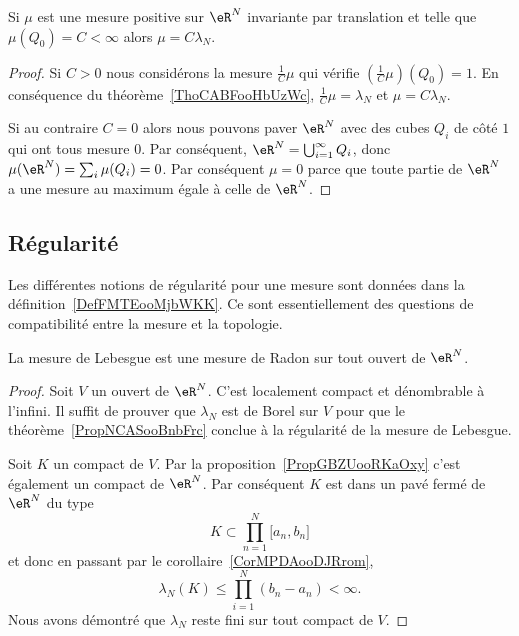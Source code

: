 \begin{corollary}       \label{CorKGMRooHWOQGP}
    Si \( \mu\) est une mesure positive sur \( \eR^N\) invariante par translation et telle que \( \mu(Q_0)=C<\infty\) alors \( \mu=C\lambda_N\).
\end{corollary}

\begin{proof}
    Si \( C>0\) nous considérons la mesure \( \frac{1}{ C }\mu\) qui vérifie \( (\frac{1}{ C }\mu)(Q_0)=1\). En conséquence du théorème~\ref{ThoCABFooHbUzWc}, \( \frac{1}{ C }\mu=\lambda_N\) et \( \mu=C\lambda_N\).

    Si au contraire \( C=0\) alors nous pouvons paver \( \eR^N\) avec des cubes \( Q_i\) de côté \( 1\) qui ont tous mesure \( 0\). Par conséquent, \( \eR^N=\bigcup_{i=1}^{\infty}Q_i\), donc \( \mu(\eR^N)=\sum_i\mu(Q_i)=0\). Par conséquent \( \mu=0\) parce que toute partie de \( \eR^N\) a une mesure au maximum égale à celle de \( \eR^N\).
\end{proof}

\subsection{Régularité}

Les différentes notions de régularité pour une mesure sont données dans la définition~\ref{DefFMTEooMjbWKK}. Ce sont essentiellement des questions de compatibilité entre la mesure et la topologie.
\begin{proposition}
    La mesure de Lebesgue est une mesure de Radon sur tout ouvert de \( \eR^N\).
\end{proposition}

\begin{proof}
    Soit \( V\) un ouvert de \( \eR^N\). C'est localement compact et dénombrable à l'infini. Il suffit de prouver que \( \lambda_N\) est de Borel sur \( V\) pour que le théorème~\ref{PropNCASooBnbFrc} conclue à la régularité de la mesure de Lebesgue.

    Soit \( K\) un compact de \( V\). Par la proposition~\ref{PropGBZUooRKaOxy} c'est également un compact de \( \eR^N\). Par conséquent \( K\) est dans un pavé fermé de \( \eR^N\) du type
    \begin{equation}
        K\subset \prod_{n=1}^N\mathopen[ a_n , b_n \mathclose]
    \end{equation}
    et donc en passant par le corollaire~\ref{CorMPDAooDJRrom},
    \begin{equation}
        \lambda_N(K)\leq \prod_{i=1}^N(b_n-a_n)<\infty.
    \end{equation}
    Nous avons démontré que \( \lambda_N\) reste fini sur tout compact de \( V\).
\end{proof}
